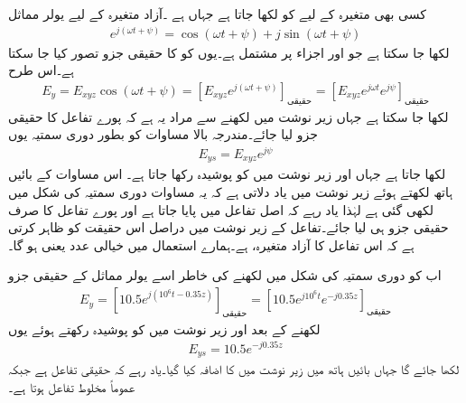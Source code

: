 کسی بھی متغیرہ  کے لیے   کو  لکھا جاتا ہے جہاں   ہے ۔آزاد متغیرہ  کے لیے یولر مماثل
\begin{align*}
e^{j (\omega t +\psi)}=\cos (\omega t +\psi) +j \sin (\omega t +\psi)
\end{align*}
لکھا جا سکتا ہے جو  اور  اجزاء پر مشتمل   ہے۔یوں  کو  کا حقیقی جزو تصور کیا جا سکتا ہے۔اس طرح
\begin{align*}
E_y=E_{xyz} \cos (\omega t +\psi)= \left[E_{xyz} e^{j(\omega t +\psi)}\right]_{\text{حقیقی}}= \left[E_{xyz} e^{j \omega t }e^{j\psi}\right]_{\text{حقیقی}}
\end{align*}
لکھا جا سکتا ہے جہاں زیر نوشت میں  لکھنے سے مراد یہ ہے کہ پورے تفاعل کا حقیقی جزو لیا جائے۔مندرجہ بالا مساوات کو بطور دوری سمتیہ یوں
\begin{align*}
E_{ys} =E_{xyz} e^{j \psi}
\end{align*}
 لکھا جاتا ہے جہاں   اور زیر نوشت میں  کو پوشیدہ رکھا جاتا ہے۔ اس مساوات کے بائیں ہاتھ  لکھتے ہوئے زیر نوشت میں  یاد دلاتی ہے کہ یہ مساوات دوری سمتیہ کی شکل میں لکھی گئی ہے لہٰذا یاد رہے کہ اصل تفاعل میں  پایا جاتا ہے اور پورے تفاعل کا صرف حقیقی جزو ہی لیا جائے۔تفاعل  کے زیر نوشت میں  دراصل اس حقیقت کو ظاہر کرتی ہے کہ  اس تفاعل کا آزاد متغیرہ،   ہے۔ہمارے استعمال میں   خیالی عدد یعنی  ہو گا۔

اب  کو دوری سمتیہ کی شکل میں لکھنے کی خاطر اسے یولر مماثل کے حقیقی جزو
\begin{align*}
E_y=\left[10.5 e^{j(10^6 t -0.35z)} \right]_{\text{حقیقی}}=\left[10.5 e^{j10^6 t} e^{ -j0.35z} \right]_{\text{حقیقی}}
\end{align*}
لکھنے کے بعد  اور زیر نوشت میں  کو پوشیدہ رکھتے ہوئے یوں
\begin{align*}
E_{ys}=10.5 e^{-j 0.35z}
\end{align*} 
لکھا جائے گا جہاں بائیں ہاتھ  میں زیر نوشت میں  کا اضافہ کیا گیا۔یاد رہے کہ  حقیقی تفاعل ہے جبکہ  عموماً مخلوط تفاعل ہوتا ہے۔

